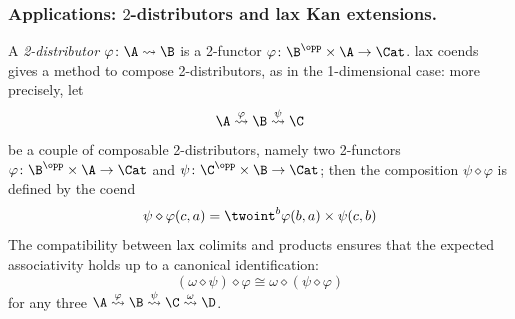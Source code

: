 \subsubsection{\bf Applications: $2$-distributors and lax Kan extensions.} A \emph{2-distributor} $\varphi \colon \A\leadsto \B$ is a 2-functor $\varphi\colon \B^\opp\times \A\to \Cat$. lax coends gives a method to compose 2-distributors, as in the 1-dimensional case: more precisely, let
\[
\A \overset{\varphi}{\leadsto}\B \overset{\psi}{\leadsto} \C
\]
be a couple of composable 2-distributors, namely two 2-functors $\varphi\colon \B^\opp\times \A\to \Cat$ and $\psi\colon \C^\opp\times \B\to \Cat$; then the composition $\psi\diamond \varphi$ is defined by the coend
\[
\psi\diamond \varphi(c,a) = \twoint^b \varphi(b,a)\times \psi(c,b)
\]
The compatibility between lax colimits and products ensures that the expected associativity holds up to a canonical identification:
\[
(\omega \diamond \psi)\diamond\varphi \cong \omega \diamond (\psi\diamond \varphi)
\]
for any three $\A\overset{\varphi}\leadsto\B\overset{\psi}\leadsto\C\overset{\omega}\leadsto\D$.

